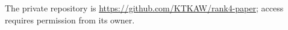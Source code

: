The private repository is \url{https://github.com/KTKAW/rank4-paper}; access requires permission from its owner. 
